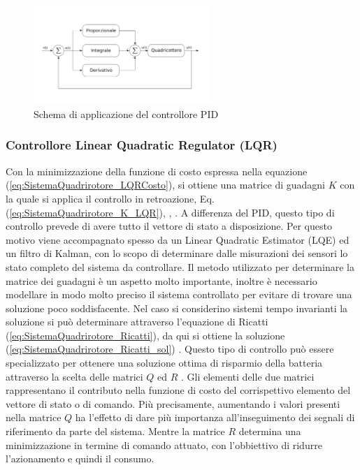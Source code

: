 \begin{figure}
	\centering
	\includegraphics[width=0.6\textwidth]{SistemaQuadrirotore/Figure/PID}
	\caption{Schema di applicazione del controllore PID}
\end{figure}

\subsubsection{Controllore Linear Quadratic Regulator (LQR)}
Con la minimizzazione della funzione di costo espressa nella equazione (\ref{eq:SistemaQuadrirotore_LQRCosto}), si ottiene una matrice di guadagni $K$ con la quale si applica il controllo in retroazione, Eq. (\ref{eq:SistemaQuadrirotore_K_LQR}), \cite{ParaskevopoulosP.N2002MCE}, \cite{6572698}. A differenza del PID, questo tipo di controllo prevede di avere tutto il vettore di stato a disposizione. Per questo motivo viene accompagnato spesso da un Linear Quadratic Estimator (LQE) ed un filtro di Kalman, con lo scopo di determinare dalle misurazioni dei sensori lo stato completo del sistema da controllare. Il metodo utilizzato per determinare la matrice dei guadagni è un aspetto molto importante, inoltre è necessario modellare in modo molto preciso il sistema controllato per evitare di trovare una soluzione poco soddisfacente. Nel caso si considerino sistemi tempo invarianti la soluzione si può determinare attraverso l'equazione di Ricatti (\ref{eq:SistemaQuadrirotore_Ricatti}), da qui si ottiene la soluzione (\ref{eq:SistemaQuadrirotore_Ricatti_sol}) \cite{baseTesi}. Questo tipo di controllo può essere specializzato per ottenere una soluzione ottima di risparmio della batteria attraverso la scelta delle matrici $Q$ ed $R$ \cite{KoksalN2018ALQA}. Gli elementi delle due matrici rappresentano il contributo nella funzione di costo del corrispettivo elemento del vettore di stato o di comando. Più precisamente, aumentando i valori presenti nella matrice $Q$ ha l'effetto di dare più importanza all'inseguimento dei segnali di riferimento da parte del sistema. Mentre la matrice $R$ determina una minimizzazione in termine di comando attuato, con l'obbiettivo di ridurre l'azionamento e quindi il consumo.


